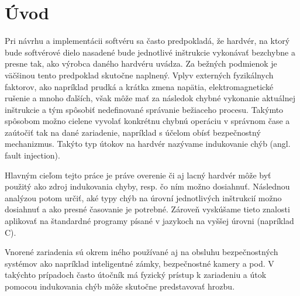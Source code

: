 \chapter*{Úvod} %

Pri návrhu a implementácii softvéru sa často predpokladá, že hardvér, na ktorý bude softvérové dielo nasadené bude jednotlivé inštrukcie vykonávať bezchybne a presne tak, ako výrobca daného hardvéru uvádza. Za bežných podmienok je väčšinou tento predpoklad skutočne naplnený. Vplyv externých fyzikálnych faktorov, ako napríklad prudká a krátka zmena napätia, elektromagnetické rušenie a mnoho ďalších, však môže mať za následok chybné vykonanie aktuálnej inštrukcie a tým spôsobiť nedefinované správanie bežiaceho procesu. Takýmto spôsobom možno cielene vyvolať konkrétnu chybnú operáciu v správnom čase a zaútočiť tak na dané zariadenie, napríklad s účelom obísť bezpečnostný mechanizmus. Takýto typ útokov na hardvér nazývame indukovanie chýb (angl. fault injection).

Hlavným cieľom tejto práce je práve overenie či aj lacný hardvér môže byť použitý ako zdroj indukovania chyby, resp. čo ním možno dosiahnuť. Následnou analýzou potom určiť, aké typy chýb na úrovní jednotlivých inštrukcií možno dosiahnuť a ako presné časovanie je potrebné. Zároveň vyskúšame tieto znalosti aplikovať na štandardné programy písané v jazykoch na vyššej úrovni (napríklad C).

 Vnorené zariadenia sú okrem iného používané aj na obsluhu bezpečnostných systémov ako napríklad inteligentné zámky, bezpečnostné kamery a pod. V takýchto prípadoch často útočník má fyzický prístup k zariadeniu a útok pomocou indukovania chýb môže skutočne predstavovať hrozbu.